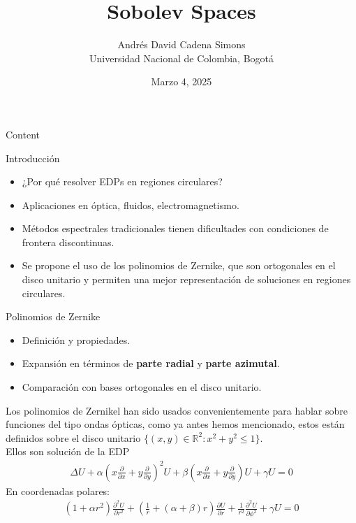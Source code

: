 \documentclass{beamer}
\title{Sobolev Spaces}
\author{\texorpdfstring{ 
Andrés David Cadena Simons \\
Universidad Nacional de Colombia, Bogotá}{A}}
\institute{ }
\date{\footnotesize Marzo 4, 2025}
\begin{document}
\begin{frame}
  \titlepage

\end{frame}


\begin{frame}{Content}
  \tableofcontents
\end{frame}

\begin{frame}{Introducción}
    \begin{itemize}
        \item ¿Por qué resolver EDPs en regiones circulares?
        \item Aplicaciones en óptica, fluidos, electromagnetismo.
        \item Métodos espectrales tradicionales tienen dificultades con condiciones de frontera discontinuas.
        \item Se propone el uso de los polinomios de Zernike, que son ortogonales en el disco unitario y permiten una mejor representación de soluciones en regiones circulares.
    \end{itemize}
\end{frame}

\begin{frame}{Polinomios de Zernike}
    \begin{itemize}
        \item Definición y propiedades.
        \item Expansión en términos de \textbf{parte radial} y \textbf{parte azimutal}.
        \item Comparación con bases ortogonales en el disco unitario.
    \end{itemize}
\end{frame}

\begin{frame}
  Los polinomios de Zernikel han sido usados convenientemente para hablar sobre funciones del tipo ondas ópticas, como ya antes hemos mencionado, estos están definidos sobre el disco unitario $\{(x,y)\in \mathbb{R}^{2}: x^2+y^2\leq 1\}$.\\
  Ellos son solución de la EDP
  \begin{align*}
    \Delta U+\alpha\left( x\frac{\partial }{\partial x}+y\frac{\partial }{\partial y} \right)^2U+\beta\left( x\frac{\partial }{\partial x}+y\frac{\partial }{\partial y} \right)U+\gamma U=0
  \end{align*}
  En coordenadas polares:
  \begin{align*}
    (1+\alpha r^2)\frac{\partial^2 U}{\partial r^2}+\left( \frac{1}{r}+(\alpha+\beta)r \right)\frac{\partial U}{\partial r}+\frac{1}{r^2}\frac{\partial ^2U}{\partial \phi^2}+\gamma U=0
  \end{align*}
\end{frame}
\end{document}
